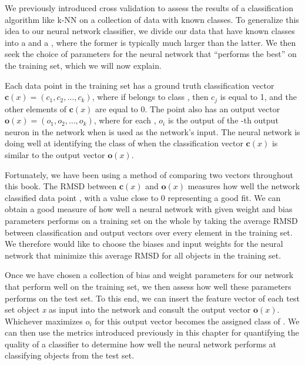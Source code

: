 We previously introduced cross validation to assess the results of a classification algorithm like k-NN on a collection of data with known classes. To generalize this idea to our neural network classifier, we divide our data that have known classes into a  and a , where the former is typically much larger than the latter. We then seek the choice of parameters for the neural network that ``performs the best'' on the training set, which we will now explain.

Each data point  in the training set has a ground truth classification vector $\mathbf{c}(x) = (c_1, c_2, \ldots, c_k)$, where if  belongs to class , then $c_j$ is equal to 1, and the other elements of $\mathbf{c}(x)$ are equal to 0. The point  also has an output vector $\mathbf{o}(x) = (o_1, o_2, \ldots, o_k)$, where for each , $o_i$  is the output of the -th output neuron in the network when  is used as the network's input. The neural network is doing well at identifying the class of  when the classification vector $\mathbf{c}(x)$ is similar to the output vector $\mathbf{o}(x)$.

Fortunately, we have been using a method of comparing two vectors throughout this book. The RMSD between $\mathbf{c}(x)$ and $\mathbf{o}(x)$ measures how well the network classified data point , with a value close to 0 representing a good fit. We can obtain a good measure of how well a neural network with given weight and bias parameters performs on a training set on the whole by taking the average RMSD between classification and output vectors over every element in the training set. We therefore would like to choose the biases and input weights for the neural network that minimize this average RMSD for all objects in the training set.

Once we have chosen a collection of bias and weight parameters for our network that perform well on the training set, we then assess how well these parameters performs on the test set. To this end, we can insert the feature vector of each test set object \textit{x} as input into the network and consult the output vector $\mathbf{o}(x)$. Whichever  maximizes $o_i$ for this output vector becomes the assigned class of . We can then use the metrics introduced previously in this chapter for quantifying the quality of a classifier to determine how well the neural network performs at classifying objects from the test set.


